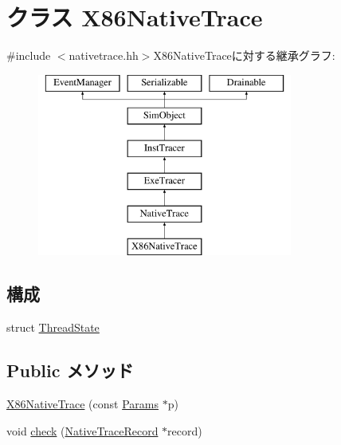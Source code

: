 \hypertarget{classTrace_1_1X86NativeTrace}{
\section{クラス X86NativeTrace}
\label{classTrace_1_1X86NativeTrace}
}


{\ttfamily \#include $<$nativetrace.hh$>$}X86NativeTraceに対する継承グラフ:\begin{figure}[H]
\begin{center}
\leavevmode
\includegraphics[height=6cm]{classTrace_1_1X86NativeTrace}
\end{center}
\end{figure}
\subsection*{構成}
\begin{DoxyCompactItemize}
\item 
struct \hyperlink{structTrace_1_1X86NativeTrace_1_1ThreadState}{ThreadState}
\end{DoxyCompactItemize}
\subsection*{Public メソッド}
\begin{DoxyCompactItemize}
\item 
\hyperlink{classTrace_1_1X86NativeTrace_af861ba55625d4733915ac926900e6944}{X86NativeTrace} (const \hyperlink{classTrace_1_1ExeTracer_a6680098765037131737b022c9fa9252e}{Params} $\ast$p)
\item 
void \hyperlink{classTrace_1_1X86NativeTrace_a826e1279dfa7dd9ce6760a2e6efe4116}{check} (\hyperlink{classTrace_1_1NativeTraceRecord}{NativeTraceRecord} $\ast$record)
\end{DoxyCompactItemize}
